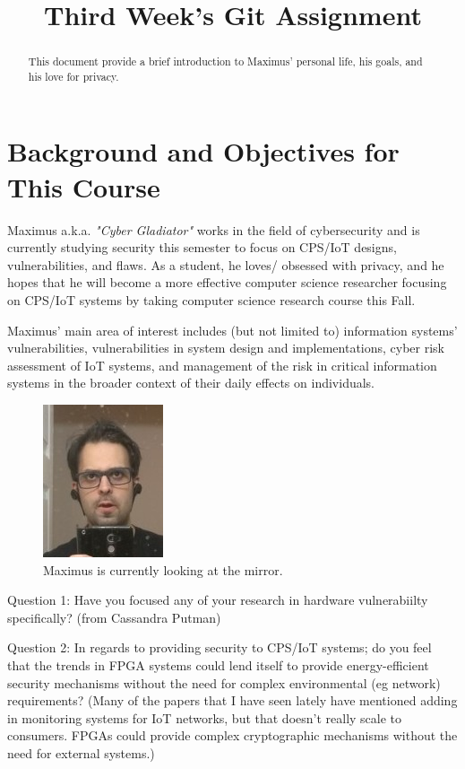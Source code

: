


 \title{Third Week's Git Assignment} 

 \maketitle


\begin{abstract}
This document provide a brief introduction to Maximus' personal life, his goals, and his love for privacy.
\end{abstract}
\section{Background and Objectives for This Course}
Maximus a.k.a. \emph{"Cyber Gladiator"} works in the field of cybersecurity and is currently studying security this semester to focus on CPS/IoT designs, vulnerabilities, and flaws. As a student, he loves/ obsessed with privacy, and he hopes that he will become a more effective computer science researcher focusing on CPS/IoT systems by taking computer science research course this Fall.

Maximus' main area of interest includes (but not limited to) information systems’ vulnerabilities, vulnerabilities in system design and implementations, cyber risk assessment of IoT systems, and management of the risk in critical information systems in the broader context of their daily effects on individuals.


\begin{figure}[htbp]
\centerline{\includegraphics{a481.jpg}}
\caption{Maximus is currently looking at the mirror.}
\label{fig}
\end{figure}

Question 1: Have you focused any of your research in hardware vulnerabiilty specifically?  (from Cassandra Putman)  

Question 2: In regards to providing security to CPS/IoT systems; do you feel that the trends in FPGA systems could lend itself to provide energy-efficient security mechanisms without the need for complex environmental (eg network) requirements? (Many of the papers that I have seen lately have mentioned adding in monitoring systems for IoT networks, but that doesn't really scale to consumers. FPGAs could provide complex cryptographic mechanisms without the need for external systems.)